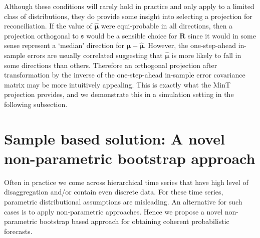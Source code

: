 \documentclass[12pt]{article}
\theoremstyle{definition}
\begin{document}
Although these conditions will rarely hold in practice and only apply to a limited class of distributions, they do provide some insight into selecting a projection for reconciliation. If the value of $\hat{\bm{\mu}}$ were equi-probable in all directions, then a projection orthogonal to $\mathfrak{s}$ would be a sensible choice for $\bm{R}$ since it would in some sense represent a `median' direction for $\bm{\mu}-\hat{\bm{\mu}}$. However, the one-step-ahead in-sample errors are usually correlated suggesting that $\hat{\bm{\mu}}$ is more likely to fall in some directions than others. Therefore an orthogonal projection after transformation by the inverse of the one-step-ahead in-sample error covariance matrix may be more intuitively appealing. This is exactly what the MinT projection provides, and we demonstrate this in a simulation setting in the following subsection.




\section{Sample based solution: A novel non-parametric bootstrap approach}\label{sec:non-para}

Often in practice we come across hierarchical time series that have high level of disaggregation and/or contain even discrete data. For these time series, parametric distributional assumptions are misleading. An alternative for such cases is to apply non-parametric approaches. Hence we propose a novel non-parametric bootstrap based approach for obtaining coherent probabilistic forecasts.
\end{document}
